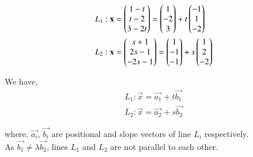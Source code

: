 \begin{align}
L_1 :\mathbf{x} &= \begin{pmatrix} 1-t \\ t-2 \\ 3-2t \end{pmatrix} = \begin{pmatrix}1\\-2\\3\end{pmatrix}+ t\begin{pmatrix}-1\\1\\-2\end{pmatrix}\\
L_2 :\mathbf{x} &= \begin{pmatrix} s+1 \\ 2s-1 \\ -2s-1 \end{pmatrix} = \begin{pmatrix}1\\-1\\-1\end{pmatrix}+ s\begin{pmatrix}1\\2\\-2\end{pmatrix} 
\end{align}

We have,
\begin{align}
    L_1 : \vec{x}= \vec{a_1} + t \vec{b_1}\label{eq:solutions/line_plane/801}\\
    L_2 : \vec{x}= \vec{a_2} + s \vec{b_2}\label{eq:solutions/line_plane/802}
\end{align}

where, $\vec{a_i}$, $\vec{b_i}$ are positional and slope vectors of line $L_i$ respectively.\\

As $\vec{b_1}\neq \lambda \vec{b_2}$, lines $L_1$ and $L_2$ are not parallel to each other.\\

